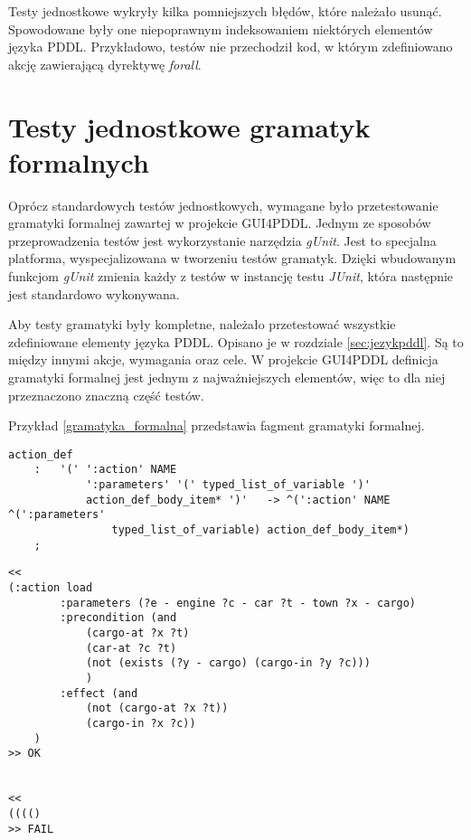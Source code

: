 Testy jednostkowe wykryły kilka pomniejszych błędów, które należało usunąć. Spowodowane były one niepoprawnym indeksowaniem niektórych elementów języka PDDL. Przykładowo, testów nie przechodził kod, w którym zdefiniowano akcję zawierającą dyrektywę \textit{forall}.
\section{Testy jednostkowe gramatyk formalnych}
Oprócz standardowych testów jednostkowych, wymagane było przetestowanie gramatyki formalnej zawartej w projekcie GUI4PDDL. Jednym ze sposobów przeprowadzenia testów jest wykorzystanie narzędzia \textit{gUnit}. Jest to specjalna platforma, wyspecjalizowana w tworzeniu testów gramatyk. Dzięki wbudowanym funkcjom \textit{gUnit} zmienia każdy z testów w instancję testu \textit{JUnit}, która następnie jest standardowo wykonywana.

Aby testy gramatyki były kompletne, należało przetestować wszystkie zdefiniowane elementy języka PDDL. Opisano je w rozdziale \ref{sec:jezykpddl}. Są to między innymi akcje, wymagania oraz cele. W projekcie GUI4PDDL definicja gramatyki formalnej jest jednym z najważniejszych elementów, więc to dla niej przeznaczono znaczną część testów.

Przykład \ref{gramatyka_formalna} przedstawia fagment gramatyki formalnej.


\begin{Code}
\begin{lstlisting}[language=LISP,frame=single,label={gramatyka_formalna}, caption={Fragment gramatyki formalnej}]
action_def 
	:	'(' ':action' NAME
			':parameters' '(' typed_list_of_variable ')'
			action_def_body_item* ')'   -> ^(':action' NAME ^(':parameters' 
				typed_list_of_variable)	action_def_body_item*) 
	;
\end{lstlisting}
\end{Code}

\begin{Code}
\begin{lstlisting}[language=LISP,frame=single,label={test_gramatyki}, caption={Przykładowe testy dla przykładu \ref{gramatyka_formalna}}]
<<
(:action load
        :parameters (?e - engine ?c - car ?t - town ?x - cargo)
        :precondition (and
            (cargo-at ?x ?t)
            (car-at ?c ?t)
            (not (exists (?y - cargo) (cargo-in ?y ?c)))
            )
        :effect (and
            (not (cargo-at ?x ?t))
            (cargo-in ?x ?c))
    )
>> OK


<<
(((()
>> FAIL
\end{lstlisting}
\end{Code}

